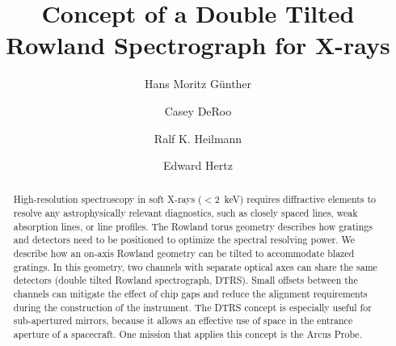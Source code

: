 \documentclass[linenumbers]{aastex631}
\begin{document}
\title{Concept of a Double Tilted Rowland Spectrograph for X-rays}





\author[0000-0003-4243-2840]{Hans Moritz G{\"u}nther}
\author[0000-0002-9184-4561]{Casey DeRoo}
\author[0000-0001-9980-5295]{Ralf K. Heilmann}
\author[0000-0002-6747-9648]{Edward Hertz}


\begin{abstract}
High-resolution spectroscopy in soft X-rays ($<2$~keV) requires diffractive elements to resolve any astrophysically relevant diagnostics, such as closely spaced lines, weak absorption lines, or line profiles. The Rowland torus geometry describes how gratings and detectors need to be positioned to optimize the spectral resolving power. We describe how an on-axis Rowland geometry can be tilted to accommodate blazed gratings. In this geometry, two channels with separate optical axes can share the same detectors (double tilted Rowland spectrograph, DTRS). Small offsets between the channels can mitigate the effect of chip gaps and reduce the alignment requirements during the construction of the instrument. The DTRS concept is especially useful for sub-apertured mirrors, because it allows an effective use of space in the entrance aperture of a spacecraft.
One mission that applies this concept is the Arcus Probe.

\end{abstract}
\end{document}
